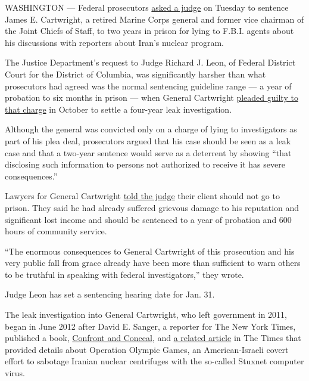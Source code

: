 WASHINGTON --- Federal prosecutors
\href{https://www.documentcloud.org/documents/3260025-Cartwright-Government-Sentencing.html}{asked
a judge} on Tuesday to sentence James E. Cartwright, a retired Marine
Corps general and former vice chairman of the Joint Chiefs of Staff, to
two years in prison for lying to F.B.I. agents about his discussions
with reporters about Iran's nuclear program.

The Justice Department's request to Judge Richard J. Leon, of Federal
District Court for the District of Columbia, was significantly harsher
than what prosecutors had agreed was the normal sentencing guideline
range --- a year of probation to six months in prison --- when General
Cartwright
\href{https://www.nytimes.com/2016/10/18/us/marine-general-james-cartwright-leak-fbi.html}{pleaded
guilty to that charge} in October to settle a four-year leak
investigation.

Although the general was convicted only on a charge of lying to
investigators as part of his plea deal, prosecutors argued that his case
should be seen as a leak case and that a two-year sentence would serve
as a deterrent by showing ``that disclosing such information to persons
not authorized to receive it has severe consequences.''

Lawyers for General Cartwright
\href{https://www.documentcloud.org/documents/3259744-Cartwright-Letters-of-Support.html}{told
the judge} their client should not go to prison. They said he had
already suffered grievous damage to his reputation and significant lost
income and should be sentenced to a year of probation and 600 hours of
community service.

``The enormous consequences to General Cartwright of this prosecution
and his very public fall from grace already have been more than
sufficient to warn others to be truthful in speaking with federal
investigators,'' they wrote.

Judge Leon has set a sentencing hearing date for Jan. 31.

The leak investigation into General Cartwright, who left government in
2011, began in June 2012 after David E. Sanger, a reporter for The New
York Times, published a book,
\href{http://www.nytimes.com/2012/06/06/books/confront-and-conceal-by-david-sanger.html}{Confront
and Conceal}, and
\href{http://www.nytimes.com/2012/06/01/world/middleeast/obama-ordered-wave-of-cyberattacks-against-iran.html}{a
related article} in The Times that provided details about Operation
Olympic Games, an American-Israeli covert effort to sabotage Iranian
nuclear centrifuges with the so-called Stuxnet computer virus.

